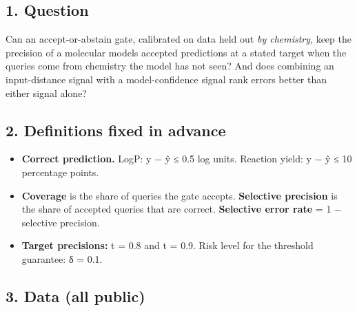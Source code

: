 \hypertarget{1-question}{%
\subsection{1. Question}\label{1-question}}

Can an accept-or-abstain gate, calibrated on data held out \emph{by
chemistry}, keep the precision of a molecular model\textquotesingle s
accepted predictions at a stated target when the queries come from
chemistry the model has not seen? And does combining an input-distance
signal with a model-confidence signal rank errors better than either
signal alone?

\hypertarget{2-definitions-fixed-in-advance}{%
\subsection{2. Definitions fixed in
advance}\label{2-definitions-fixed-in-advance}}

\begin{itemize}
\tightlist
\item
  \textbf{Correct prediction.} LogP: \textbar y − ŷ\textbar{} ≤ 0.5 log
  units. Reaction yield: \textbar y − ŷ\textbar{} ≤ 10 percentage
  points.
\item
  \textbf{Coverage} is the share of queries the gate accepts.
  \textbf{Selective precision} is the share of accepted queries that are
  correct. \textbf{Selective error rate} = 1 − selective precision.
\item
  \textbf{Target precisions:} t = 0.8 and t = 0.9. Risk level for the
  threshold guarantee: δ = 0.1.
\end{itemize}

\hypertarget{3-data-all-public}{%
\subsection{3. Data (all public)}\label{3-data-all-public}}

